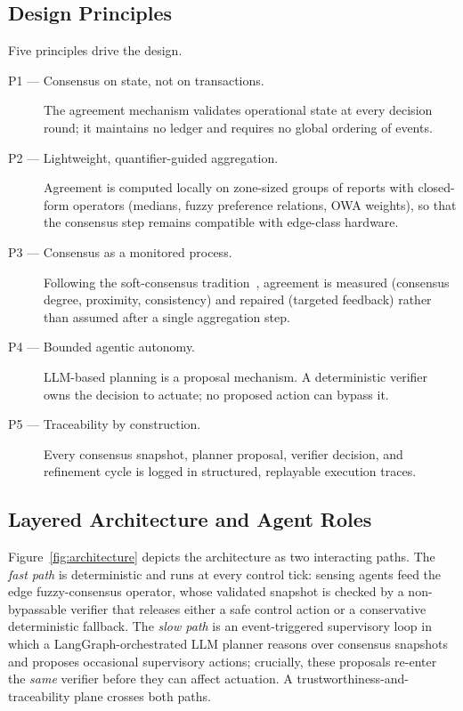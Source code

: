 \documentclass[preprint,11pt]{elsarticle}
\begin{document}
\subsection{Design Principles}
\label{sec:principles}

Five principles drive the design.

\begin{description}
\item[P1 --- Consensus on state, not on transactions.] The agreement
mechanism validates operational state at every decision round; it
maintains no ledger and requires no global ordering of events.
\item[P2 --- Lightweight, quantifier-guided aggregation.] Agreement is
computed locally on zone-sized groups of reports with closed-form
operators (medians, fuzzy preference relations, OWA weights), so that
the consensus step remains compatible with edge-class hardware.
\item[P3 --- Consensus as a monitored process.] Following the
soft-consensus tradition~\cite{herreraviedma2014}, agreement is measured
(consensus degree, proximity, consistency) and repaired (targeted
feedback) rather than assumed after a single aggregation step.
\item[P4 --- Bounded agentic autonomy.] LLM-based planning is a
proposal mechanism. A deterministic verifier owns the decision to
actuate; no proposed action can bypass it.
\item[P5 --- Traceability by construction.] Every consensus snapshot,
planner proposal, verifier decision, and refinement cycle is logged in
structured, replayable execution traces.
\end{description}

\subsection{Layered Architecture and Agent Roles}
\label{sec:layers}

Figure~\ref{fig:architecture} depicts the architecture as two
interacting paths. The \emph{fast path} is deterministic and runs at
every control tick: sensing agents feed the edge fuzzy-consensus
operator, whose validated snapshot is checked by a non-bypassable
verifier that releases either a safe control action or a conservative
deterministic fallback. The \emph{slow path} is an event-triggered
supervisory loop in which a LangGraph-orchestrated LLM planner reasons
over consensus snapshots and proposes occasional supervisory actions;
crucially, these proposals re-enter the \emph{same} verifier before they
can affect actuation. A trustworthiness-and-traceability plane crosses
both paths.
\end{document}
